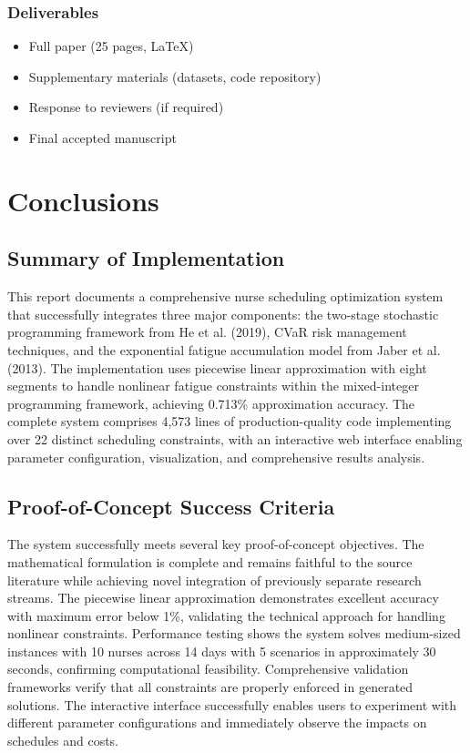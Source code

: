 \documentclass[11pt,letterpaper]{article}
\begin{document}
\subsubsection{Deliverables}
\begin{itemize}[leftmargin=*]
    \item Full paper (25 pages, LaTeX)
    \item Supplementary materials (datasets, code repository)
    \item Response to reviewers (if required)
    \item Final accepted manuscript
\end{itemize}

\section{Conclusions}

\subsection{Summary of Implementation}
This report documents a comprehensive nurse scheduling optimization system that successfully integrates three major components: the two-stage stochastic programming framework from He et al. (2019), CVaR risk management techniques, and the exponential fatigue accumulation model from Jaber et al. (2013). The implementation uses piecewise linear approximation with eight segments to handle nonlinear fatigue constraints within the mixed-integer programming framework, achieving 0.713\% approximation accuracy. The complete system comprises 4,573 lines of production-quality code implementing over 22 distinct scheduling constraints, with an interactive web interface enabling parameter configuration, visualization, and comprehensive results analysis.

\subsection{Proof-of-Concept Success Criteria}
The system successfully meets several key proof-of-concept objectives. The mathematical formulation is complete and remains faithful to the source literature while achieving novel integration of previously separate research streams. The piecewise linear approximation demonstrates excellent accuracy with maximum error below 1\%, validating the technical approach for handling nonlinear constraints. Performance testing shows the system solves medium-sized instances with 10 nurses across 14 days with 5 scenarios in approximately 30 seconds, confirming computational feasibility. Comprehensive validation frameworks verify that all constraints are properly enforced in generated solutions. The interactive interface successfully enables users to experiment with different parameter configurations and immediately observe the impacts on schedules and costs.
\end{document}

